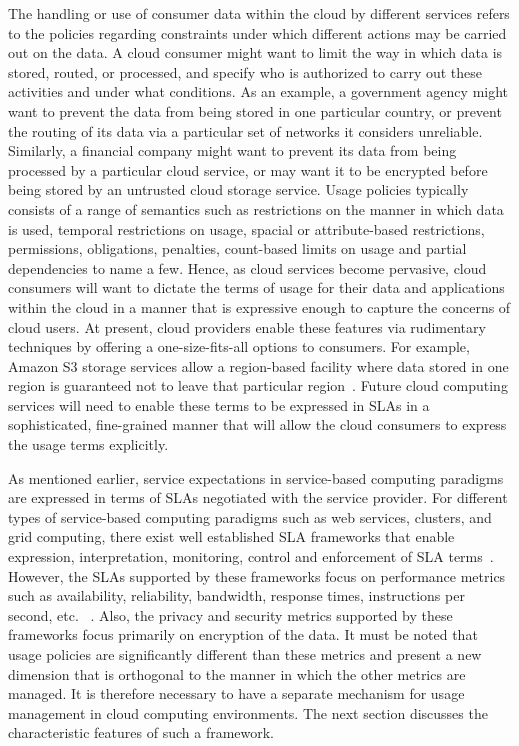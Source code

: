 \documentclass[times, 10pt,twocolumn]{article}
\begin{document}
The handling or use of consumer data within the cloud by different services refers to the policies regarding constraints under which different actions may be carried out on the data. A cloud consumer might want to limit the way in which data is stored, routed, or processed, and specify who is authorized to carry out these activities and under what conditions. As an example, a government agency might want to prevent the data from being stored in one particular country, or prevent the routing of its data via a particular set of networks it considers unreliable. Similarly, a financial company might want to prevent its data from being processed by a particular cloud service, or may want it to be encrypted before being stored by an untrusted cloud storage service. Usage policies typically consists of a range of semantics such as restrictions on the manner in which data is used, temporal restrictions on usage, spacial or attribute-based restrictions, permissions, obligations, penalties, count-based limits on usage and partial dependencies to name a few.   Hence, as cloud services become pervasive, cloud consumers will want to dictate the terms of usage for their data and applications within the cloud in a manner that is expressive enough to capture the concerns of cloud users. At present, cloud providers enable these features via rudimentary techniques by offering a one-size-fits-all options to consumers. For example, Amazon S3 storage services allow a region-based facility where data stored in one region is guaranteed not to leave that particular region~\cite{AWS}. Future cloud computing services will need to enable these terms to be expressed in SLAs in a sophisticated, fine-grained manner that will allow the cloud consumers to express the usage terms explicitly. 

As mentioned earlier, service expectations in service-based computing paradigms are expressed in terms of SLAs negotiated with the service provider. For different types of service-based computing paradigms such as web services, clusters, and grid computing, there exist well established SLA frameworks that enable expression, interpretation, monitoring, control and enforcement of SLA terms~\cite{WSA, WSLA, WSP,PaRaSh:09}. However, the SLAs supported by these frameworks focus on performance metrics such as availability, reliability, bandwidth, response times, instructions per second, etc. ~\cite{PaSc:06}. Also, the privacy and security metrics supported by these frameworks focus primarily on encryption of the data. It must be noted that usage policies are significantly different than these metrics and present a new dimension that is orthogonal to the manner in which the other metrics are managed. It is therefore necessary to have a separate mechanism for usage management in cloud computing environments. The next section discusses the characteristic features of such a framework. 
\end{document}
